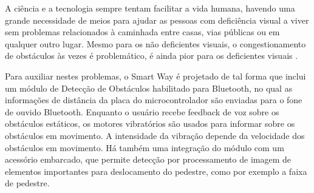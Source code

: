 A ciência e a tecnologia sempre tentam facilitar a vida humana, havendo uma grande necessidade de meios para ajudar as pessoas com deficiência visual a viver sem problemas relacionados à caminhada entre casas, vias públicas ou em qualquer outro lugar. Mesmo para os não deficientes visuais, o congestionamento de obstáculos às vezes é
problemático, é ainda pior para os deficientes visuais \cite{Therib2017}.

Para auxiliar nestes problemas, o Smart Way é projetado de tal forma que inclui um módulo de Detecção de Obstáculos habilitado para Bluetooth, no qual as informações de distância da placa do microcontrolador são enviadas para o fone de ouvido Bluetooth. Enquanto o usuário recebe feedback de voz sobre os obstáculos estáticos, os motores vibratórios são usados para informar sobre os obstáculos em movimento. A intensidade da vibração depende da velocidade dos obstáculos em movimento. Há também uma integração do módulo com um acessório embarcado, que permite detecção por processamento de imagem de elementos importantes para deslocamento do pedestre, como por exemplo a faixa de pedestre.